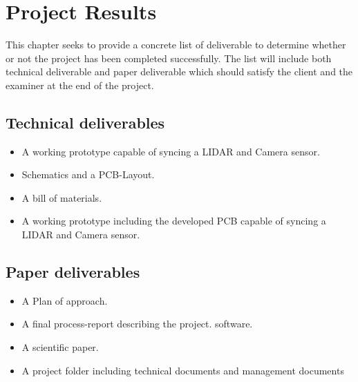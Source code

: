 \chapter{Project Results}
\label{ch:results}
This chapter seeks to provide a concrete list of deliverable to determine whether or not the project has been completed successfully. The list will include both technical deliverable and paper deliverable which should satisfy the client and the examiner at the end of the project.

\section{Technical deliverables}
\begin{itemize}
    \item A working prototype capable of syncing a LIDAR and Camera sensor.
    \item Schematics and a PCB-Layout.
    \item A bill of materials.
    \item A working prototype including the developed PCB capable of syncing a LIDAR and Camera sensor.
\end{itemize}

\section{Paper deliverables}
\begin{itemize}
    \item A Plan of approach.
    \item A final process-report describing the project.
    software.
    \item A scientific paper.
    \item A project folder including technical documents and management documents
\end{itemize}